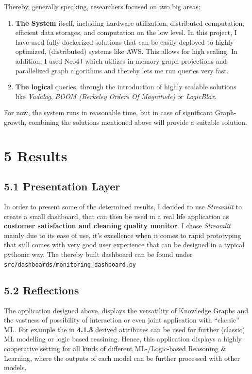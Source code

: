 \documentclass[
]{article}
\begin{document}
Thereby, generally speaking, researchers focused on two big areas: 
\begin{enumerate}
  \item \textbf{The System} itself, including hardware utilization, distributed computation, efficient data storages, and computation on the low level. In this project, I have used fully dockerized solutions that can be easily deployed to highly optimized, (distributed) systems like AWS. This allows for high scaling. In addition, I used Neo4J which utilizes in-memory graph projections and parallelized graph algorithms and thereby lets me run queries very fast.
  \item \textbf{The logical} queries, through the introduction of highly scalable solutions like \emph{Vadalog}, \emph{BOOM (Berkeley Orders Of Magnitude)} or \emph{LogicBlox}.
\end{enumerate}

For now, the system runs in reasonable time, but in case of significant
Graph-growth, combining the solutions mentioned above will provide a
suitable solution.

\pagebreak

\section{5 Results}\label{results-1}

\subsection{5.1 Presentation Layer}\label{presentation-layer}

In order to present some of the determined results, I decided to use
\emph{Streamlit} to create a small dashboard, that can then be used in a
real life application as \textbf{customer satisfaction and cleaning
quality monitor}. I chose \emph{Streamlit} mainly due to its ease of use,
it's excellence when it comes to rapid prototyping that still comes with
very good user experience that can be designed in a typical pythonic
way. The thereby built dashboard can be found under
\texttt{src/dashboards/monitoring\_dashboard.py}

\subsection{5.2 Reflections}\label{reflections}

The application designed above, displays the versatility of Knowledge
Graphs and the vastness of possibility of interaction or even joint
application with ``classic'' ML. For example the in \textbf{4.1.3}
derived attributes can be used for further (classic) ML modelling or
logic based reasining. Hence, this application displays a highly
cooperative setting for all kinds of different ML-/Logic-based Reasoning
\& Learning, where the outputs of each model can be further processed
with other models.
\end{document}

